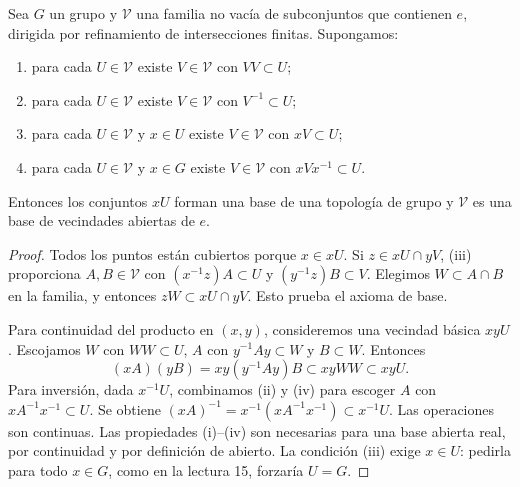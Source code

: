 \begin{teorema}\label{v4:base-identidad}
Sea $G$ un grupo y $\mathcal V$ una familia no vacía de subconjuntos que contienen $e$, dirigida por refinamiento de intersecciones finitas. Supongamos:
\begin{enumerate}
\item para cada $U\in\mathcal V$ existe $V\in\mathcal V$ con $VV\subset U$;
\item para cada $U\in\mathcal V$ existe $V\in\mathcal V$ con $V^{-1}\subset U$;
\item para cada $U\in\mathcal V$ y $x\in U$ existe $V\in\mathcal V$ con $xV\subset U$;
\item para cada $U\in\mathcal V$ y $x\in G$ existe $V\in\mathcal V$ con $xVx^{-1}\subset U$.
\end{enumerate}
Entonces los conjuntos $xU$ forman una base de una topología de grupo y $\mathcal V$ es una base de vecindades abiertas de $e$.
\end{teorema}
\begin{proof}
Todos los puntos están cubiertos porque $x\in xU$. Si $z\in xU\cap yV$, (iii) proporciona $A,B\in\mathcal V$ con $(x^{-1}z)A\subset U$ y $(y^{-1}z)B\subset V$. Elegimos $W\subset A\cap B$ en la familia, y entonces $zW\subset xU\cap yV$. Esto prueba el axioma de base.

Para continuidad del producto en $(x,y)$, consideremos una vecindad básica $xyU$. Escojamos $W$ con $WW\subset U$, $A$ con $y^{-1}Ay\subset W$ y $B\subset W$. Entonces
\[
 (xA)(yB)=xy(y^{-1}Ay)B\subset xyWW\subset xyU.
\]
Para inversión, dada $x^{-1}U$, combinamos (ii) y (iv) para escoger $A$ con $xA^{-1}x^{-1}\subset U$. Se obtiene $(xA)^{-1}=x^{-1}(xA^{-1}x^{-1})\subset x^{-1}U$. Las operaciones son continuas. Las propiedades (i)--(iv) son necesarias para una base abierta real, por continuidad y por definición de abierto. La condición (iii) exige $x\in U$: pedirla para todo $x\in G$, como en la lectura 15, forzaría $U=G$.
\end{proof}

